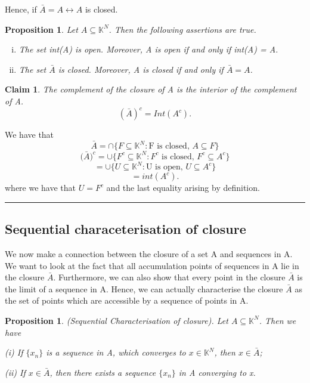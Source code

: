 \documentclass[twoside]{article}
\newtheorem{proposition}[theorem]{Proposition}
\newtheorem{claim}[theorem]{Claim}
\newenvironment{proof}{{\bf Proof:}}{\hfill\rule{2mm}{2mm}}
\begin{document}
Hence, if $\bar{A} = A \leftrightarrow A$ is closed.

\begin{proposition}Let $A \subseteq \mathbb{K}^N$. Then the following assertions are true.

\begin{enumerate}[(i)]
  \item The set int(A) is open. Moreover, A is open if and only if int(A) = A.
  \item The set $\bar{A}$ is closed. Moreover, A is closed if and only if $\bar{A} = A$.
\end{enumerate}
\end{proposition}

\begin{claim}
The complement of the closure of A is the interior of the complement of A. 
$$
(\bar{A})^c = Int(A^c).
$$
\end{claim}

\begin{proof}
We have that
$$
\bar{A} = \cap\{F \subseteq \mathbb{K}^N: \text{F is closed, } A \subseteq F\}
$$
$$
\big(\bar{A}\big)^c = \cup\{F^c \subseteq \mathbb{K}^N: F^c\text{ is closed, } F^c \subseteq A^c\}
$$
$$
= \cup\{U \subseteq \mathbb{K}^N: \text{U is open, } U \subseteq A^c\}
$$
$$
= int(A^c).
$$
where we have that $U = F^c$ and the last equality arising by definition.
\end{proof}

\subsection{Sequential characeterisation of closure}
We now make a connection between the closure of a set A and sequences in A. We want to look at the fact that all accumulation points of sequences in A lie in the closure $\bar{A}$. Furthermore, we can also show that every point in the closure $\bar{A}$ is the limit of a sequence in A. Hence, we can actually characterise the closure $\bar{A}$ as the set of points which are accessible by a sequence of points in A.
\begin{proposition}(Sequential Characterisation of closure). Let $A \subseteq \mathbb{K}^N$. Then we have 

(i) If $\{x_n\}$ is a sequence in A, which converges to $x \in \mathbb{K}^N$, then $x \in \bar{A}$;

(ii) If $x \in \bar{A}$, then there exists a sequence $\{x_n\}$ in A converging to x.
\end{proposition}
\end{document}
